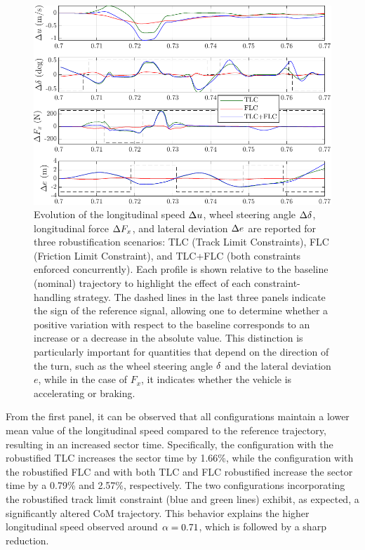 \begin{figure}
	\centering
	\includegraphics{Fig/ol_telemetries.pdf}
	\caption{Evolution of the longitudinal speed $\Delta u$, wheel steering angle $\Delta \delta$, longitudinal force $\Delta F_x$, and lateral deviation $\Delta e$ are reported for three robustification scenarios: TLC (Track Limit Constraints), FLC (Friction Limit Constraint), and TLC+FLC (both constraints enforced concurrently). Each profile is shown relative to the baseline (nominal) trajectory to highlight the effect of each constraint-handling strategy. The dashed lines in the last three panels indicate the sign of the reference signal, allowing one to determine whether a positive variation with respect to the baseline corresponds to an increase or a decrease in the absolute value. This distinction is particularly important for quantities that depend on the direction of the turn, such as the wheel steering angle $\delta$ and the lateral deviation $e$, while in the case of $F_x$, it indicates whether the vehicle is accelerating or braking.}
	\label{fig:ol_telemetries}
\end{figure}

From the first panel, it can be observed that all configurations maintain a lower mean value of the longitudinal speed compared to the reference trajectory, resulting in an increased sector time. Specifically, the configuration with the robustified TLC increases the sector time by 1.66\%, while the configuration with the robustified FLC and with both TLC and FLC robustified increase the sector time by a 0.79\% and 2.57\%, respectively.
The two configurations incorporating the robustified track limit constraint (blue and green lines) exhibit, as expected, a significantly altered CoM trajectory. This behavior explains the higher longitudinal speed observed around $\alpha = 0.71$, which is followed by a sharp reduction. 

